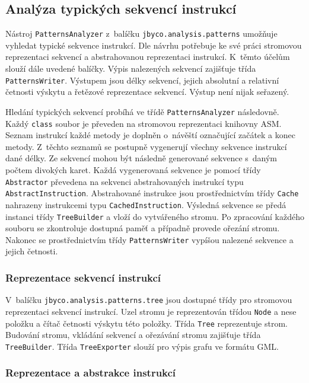 \subsection{Analýza typických sekvencí instrukcí}

Nástroj \texttt{PatternsAnalyzer} z~balíčku \texttt{jbyco.analysis.patterns} umožňuje vyhledat typické sekvence instrukcí. Dle návrhu potřebuje ke své práci stromovou reprezentaci sekvencí a abstrahovanou reprezentaci instrukcí. K~těmto účelům slouží dále uvedené balíčky. Výpis nalezených sekvencí zajišťuje třída \texttt{PatternsWriter}. Výstupem jsou délky sekvencí, jejich absolutní a relativní četnosti výskytu a řetězové reprezentace sekvencí. Výstup není nijak seřazený.

Hledání typických sekvencí probíhá ve třídě \texttt{PatternsAnalyzer} následovně. Každý \texttt{class} soubor je převeden na stromovou reprezentaci knihovny ASM. Seznam instrukcí každé metody je doplněn o~návěští označující začátek a konec metody. Z~těchto seznamů se postupně vygenerují všechny sekvence instrukcí dané délky. Ze sekvencí mohou být následně generované sekvence s~daným počtem divokých karet. Každá vygenerovaná sekvence je pomocí třídy \texttt{Abstractor} převedena na sekvenci abstrahovaných instrukcí typu \texttt{AbstractInstruction}. Abstrahované instrukce jsou prostřednictvím třídy \texttt{Cache} nahrazeny instrukcemi typu \texttt{CachedInstruction}. Výsledná sekvence se předá instanci třídy \texttt{TreeBuilder} a vloží do vytvářeného stromu. Po zpracování každého souboru se zkontroluje dostupná paměť a případně provede ořezání stromu. Nakonec se prostřednictvím třídy \texttt{PatternsWriter} vypíšou nalezené sekvence a jejich četnosti.

\subsubsection{Reprezentace sekvencí instrukcí}

V~balíčku \texttt{jbyco.analysis.patterns.tree} jsou dostupné třídy pro stromovou reprezentaci sekvencí instrukcí. Uzel stromu je reprezentován třídou \texttt{Node} a nese položku a čítač četnosti výskytu této položky. Třída \texttt{Tree} reprezentuje strom. Budování stromu, vkládání sekvencí a ořezávání stromu zajišťuje třída \texttt{TreeBuilder}. Třída \texttt{TreeExporter} slouží pro výpis grafu ve formátu GML.

\subsubsection{Reprezentace a abstrakce instrukcí}


